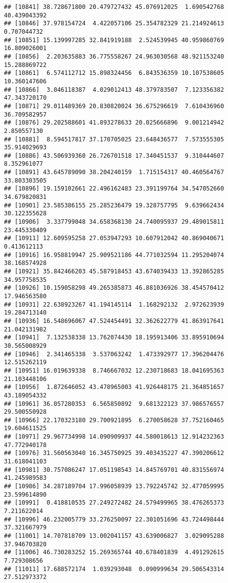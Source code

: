 \documentclass[
]{article}
\begin{document}
\begin{verbatim}
## [10841] 38.728671800 20.479727432 45.076912025  1.690542768 40.439043392
## [10846] 37.978154724  4.422057106 25.354782329 21.214924613  0.707044732
## [10851] 15.139997285 32.841919188  2.524539945 40.959860769 16.809026001
## [10856]  2.203635883 36.775558267 24.963030568 48.921153240 15.288869722
## [10861]  6.574112712 15.898324456  6.843536359 10.107538605 10.360147606
## [10866]  3.046118387  4.029012413 48.379783507  7.123356382 47.343720170
## [10871] 29.011489369 20.830820024 36.675296619  7.610436960 36.709582957
## [10876] 29.202588601 41.893278633 20.025666896  9.001214942  2.850557130
## [10881]  8.594517817 37.170705025 23.648436577  7.573555305 35.914029693
## [10886] 43.506939360 26.726701518 17.340451537  9.310444607  8.352961077
## [10891] 43.645789090 38.204240159  1.715154317 40.460564767 33.803303505
## [10896] 19.159102661 22.496162483 23.391199764 34.547052660 34.679820831
## [10901] 23.585386155 25.285236479 19.328757795  9.639662434 30.122355628
## [10906]  3.337799048 34.658368130 24.740095937 29.489015811 23.445330409
## [10911] 12.609595258 27.053947293 10.607912042 40.869040671  0.413612113
## [10916] 16.958819947 25.909521186 44.771032594 11.295204074 38.168574928
## [10921] 35.842466203 45.587918453 43.674039433 13.392865285 34.957758535
## [10926] 10.159058298 49.265385873 46.881036926 38.454570412 17.946563580
## [10931] 22.638923267 41.194145114  1.168292132  2.972623939 19.284713140
## [10936] 16.548696067 47.524454491 32.362622779 41.863917641 21.042131982
## [10941]  7.132538338 13.762074430 18.195913406 33.895910694 30.565008929
## [10946]  2.341465338  3.537063242  1.473392977 17.396204476 12.515262119
## [10951] 16.019639338  8.746667032 12.230718683 18.041695363 21.103448106
## [10956]  1.872646052 43.478965003 41.926448175 21.364851657 43.189054332
## [10961] 36.057280353  6.565850892  9.681322123 37.986576557 29.500550928
## [10966] 22.170323180 29.700921895  6.270058628 37.752160465 19.604611525
## [10971] 29.967734998 14.090909937 44.580018613 12.914232363 47.772940178
## [10976] 31.560563040 16.345750925 39.403435227 47.390206612 31.618041103
## [10981] 30.757086247 17.051198543 14.845769701 40.831556974 41.245989583
## [10986] 34.287189704 17.996058939 13.792245742 32.477059995 23.599614890
## [10991]  0.418810535 27.249272482 24.579499965 38.476265373  7.211622014
## [10996] 46.232005779 33.276250097 22.301051696 43.724498444 37.321667979
## [11001] 14.707818709 13.002041157 43.639006827  3.029095288 37.946703820
## [11006] 46.730283252 15.269365744 40.678401839  4.491292615  7.729308656
## [11011] 17.688572174  1.039293048  0.090999634 29.506543314 27.512973372

\end{verbatim}
\end{document}
